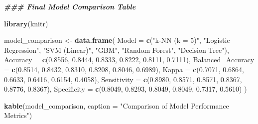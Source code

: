 \documentclass[
]{article}
\newenvironment{Shaded}{\begin{snugshade}}{\end{snugshade}}
\newcommand{\AttributeTok}[1]{\textcolor[rgb]{0.13,0.29,0.53}{#1}}
\newcommand{\DocumentationTok}[1]{\textcolor[rgb]{0.56,0.35,0.01}{\textbf{\textit{#1}}}}
\newcommand{\FloatTok}[1]{\textcolor[rgb]{0.00,0.00,0.81}{#1}}
\newcommand{\FunctionTok}[1]{\textcolor[rgb]{0.13,0.29,0.53}{\textbf{#1}}}
\newcommand{\NormalTok}[1]{#1}
\newcommand{\OtherTok}[1]{\textcolor[rgb]{0.56,0.35,0.01}{#1}}
\newcommand{\StringTok}[1]{\textcolor[rgb]{0.31,0.60,0.02}{#1}}
\begin{document}
\begin{Shaded}
\begin{Highlighting}[]
\DocumentationTok{\#\#\# Final Model Comparison Table}

\FunctionTok{library}\NormalTok{(knitr)}

\NormalTok{model\_comparison }\OtherTok{\textless{}{-}} \FunctionTok{data.frame}\NormalTok{(}
  \AttributeTok{Model =} \FunctionTok{c}\NormalTok{(}\StringTok{"k{-}NN (k = 5)"}\NormalTok{, }\StringTok{"Logistic Regression"}\NormalTok{, }\StringTok{"SVM (Linear)"}\NormalTok{, }\StringTok{"GBM"}\NormalTok{, }\StringTok{"Random Forest"}\NormalTok{, }\StringTok{"Decision Tree"}\NormalTok{),}
  \AttributeTok{Accuracy =} \FunctionTok{c}\NormalTok{(}\FloatTok{0.8556}\NormalTok{, }\FloatTok{0.8444}\NormalTok{, }\FloatTok{0.8333}\NormalTok{, }\FloatTok{0.8222}\NormalTok{, }\FloatTok{0.8111}\NormalTok{, }\FloatTok{0.7111}\NormalTok{),}
  \AttributeTok{Balanced\_Accuracy =} \FunctionTok{c}\NormalTok{(}\FloatTok{0.8514}\NormalTok{, }\FloatTok{0.8432}\NormalTok{, }\FloatTok{0.8310}\NormalTok{, }\FloatTok{0.8208}\NormalTok{, }\FloatTok{0.8046}\NormalTok{, }\FloatTok{0.6989}\NormalTok{),}
  \AttributeTok{Kappa =} \FunctionTok{c}\NormalTok{(}\FloatTok{0.7071}\NormalTok{, }\FloatTok{0.6864}\NormalTok{, }\FloatTok{0.6633}\NormalTok{, }\FloatTok{0.6416}\NormalTok{, }\FloatTok{0.6154}\NormalTok{, }\FloatTok{0.4058}\NormalTok{),}
  \AttributeTok{Sensitivity =} \FunctionTok{c}\NormalTok{(}\FloatTok{0.8980}\NormalTok{, }\FloatTok{0.8571}\NormalTok{, }\FloatTok{0.8571}\NormalTok{, }\FloatTok{0.8367}\NormalTok{, }\FloatTok{0.8776}\NormalTok{, }\FloatTok{0.8367}\NormalTok{),}
  \AttributeTok{Specificity =} \FunctionTok{c}\NormalTok{(}\FloatTok{0.8049}\NormalTok{, }\FloatTok{0.8293}\NormalTok{, }\FloatTok{0.8049}\NormalTok{, }\FloatTok{0.8049}\NormalTok{, }\FloatTok{0.7317}\NormalTok{, }\FloatTok{0.5610}\NormalTok{)}
\NormalTok{)}

\FunctionTok{kable}\NormalTok{(model\_comparison, }\AttributeTok{caption =} \StringTok{"Comparison of Model Performance Metrics"}\NormalTok{)}
\end{Highlighting}
\end{Shaded}
\end{document}

